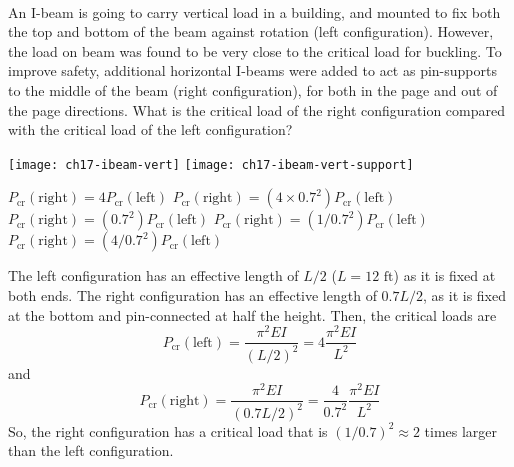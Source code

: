 \variant
\\
\begin{minipage}[t]{3.25in}
An I-beam is going to carry vertical load in a building, and mounted to fix both the top and bottom of the beam against rotation (left configuration). However, the load on beam was found to be very close to the critical load for buckling. To improve safety, additional horizontal I-beams were added to act as pin-supports to the middle of the beam (right configuration), for both in the page and out of the page directions. What is the  critical load of the right configuration compared with the critical load of the left configuration?
\end{minipage}
\quad
\begin{minipage}[t]{2.75in}
\vspace{-12pt}
\texttt{[image: ch17-ibeam-vert]}
\texttt{[image: ch17-ibeam-vert-support]}
\end{minipage}
\begin{answers}
\answer $P_\text{cr}(\text{right}) = 4 P_\text{cr}(\text{left})$
\answer $P_\text{cr}(\text{right}) = (4\times 0.7^2) P_\text{cr}(\text{left})$
\answer $P_\text{cr}(\text{right}) = (0.7^2) P_\text{cr}(\text{left})$
\correctanswer $P_\text{cr}(\text{right}) = (1/0.7^2) P_\text{cr}(\text{left})$
\answer $P_\text{cr}(\text{right}) = (4/0.7^2) P_\text{cr}(\text{left})$
\end{answers}
\begin{solution}
The left configuration has an effective length of $L/2$ ($L = 12\text{ ft}$) as it is fixed at both ends. The right configuration has an effective length of $0.7 L/2$, as it is fixed at the bottom and pin-connected at half the height. Then, the critical loads are
\[
P_\text{cr}(\text{left}) = \frac{\pi^2 EI}{(L/2)^2} = 4\frac{\pi^2 EI}{L^2}
\]
and
\[
P_\text{cr}(\text{right}) = \frac{\pi^2 EI}{(0.7 L/2)^2} = \frac{4}{0.7^2} \frac{\pi^2 EI}{L^2}
\]
So, the right configuration has a critical load that is $(1/0.7)^2 \approx 2$ times larger than the left configuration.
\end{solution}


